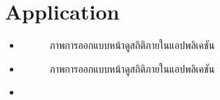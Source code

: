 \documentclass[12pt,oneside,openright,a4paper]{cpe-thai-project}
\begin{document}
\section{Application}
\begin{itemize}
  \item   \begin{figure}[!ht]\centering
    \setlength{\fboxrule}{0.2mm} %
    \setlength{\fboxsep}{1cm}
    \caption{ภาพการออกแบบหน้าดูสถิติภายในแอปพลิเคชัน}\label{fig:system}
  \end{figure}
    \item   \begin{figure}[!ht]\centering
      \setlength{\fboxrule}{0.2mm} %
      \setlength{\fboxsep}{1cm}
      \caption{ภาพการออกแบบหน้าดูสถิติภายในแอปพลิเคชัน}\label{fig:system}
    \end{figure}
 \item   \begin{figure}[!ht]\centering
    \setlength{\fboxrule}{0.2mm} %
    \setlength{\fboxsep}{1cm}

\end{figure}
\end{itemize}
\end{document}
